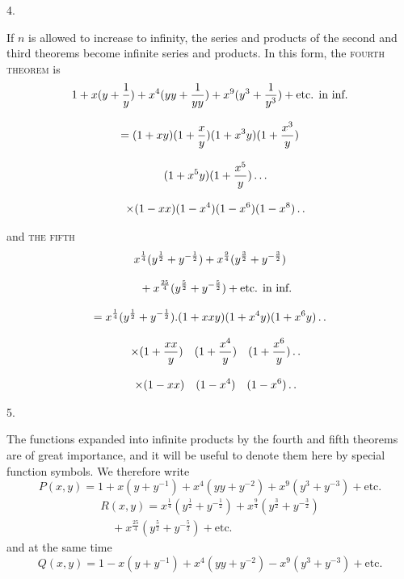 \begingroup
\renewcommand{\arraystretch}{1.45}

\par\medskip{}\centerline{4.}\nobreak\smallskip
If $n$ is allowed to increase to infinity, the series and products of the second and third theorems become infinite series and products. In this form, the \textsc{fourth theorem} is
\[
\begin{gathered}
1+x(y+\frac1y)+x^4(yy+\frac1{yy})+x^9(y^3+\frac1{y^3})+\text{etc. in inf.}\\[8pt]
=(1+xy)(1+\frac xy)(1+x^3y)(1+\frac{x^3}y)\\[8pt]\quad{}(1+x^5y)(1+\frac{x^5}y)\mathinner{.\,.\,.}\\[8pt]
\quad\times(1-xx)(1-x^4)(1-x^6)(1-x^8)\mathinner{.\,.}
\end{gathered}
\]

and \textsc{the fifth}
\[
\begin{gathered}
x^{\frac14}(y^{\frac12}+y^{-\frac12})+x^{\frac94}(y^{\frac32}+y^{-\frac32})\\[8pt]\quad{}+x^{\frac{25}4}(y^{\frac52}+y^{-\frac52})+\text{etc. in inf.}\\[8pt]
=x^{\frac14}(y^{\frac12}+y^{-\frac12}).(1+xxy)(1+x^4y)(1+x^6y)\mathinner{.\,.}\\[8pt]
\quad\times(1+\frac{xx}y)\quad(1+\frac{x^4}y)\quad(1+\frac{x^6}y)\mathinner{.\,.}\\[8pt]
\quad\times(1-xx)\quad(1-x^4)\quad(1-x^6)\mathinner{.\,.}
\end{gathered}
\]



\par\medskip{}\centerline{5.}\nobreak\smallskip
The functions expanded into infinite products by the fourth and fifth theorems are of great importance, and it will be useful to denote them here by special function symbols. We therefore write
\[
P(x,y)=1+x(y+y^{-1})+x^4(yy+y^{-2})+x^9(y^3+y^{-3})+\text{etc.}
\]
\[
\begin{gathered}R(x,y)=x^{\frac14}(y^{\frac12}+y^{-\frac12})+x^{\frac94}(y^{\frac32}+y^{-\frac32})\\[8pt]\quad{}+x^{\frac{25}4}(y^{\frac52}+y^{-\frac52})+\text{etc.}\end{gathered}
\]
and at the same time
\[
Q(x,y)=1-x(y+y^{-1})+x^4(yy+y^{-2})-x^9(y^3+y^{-3})+\text{etc.}
\]

